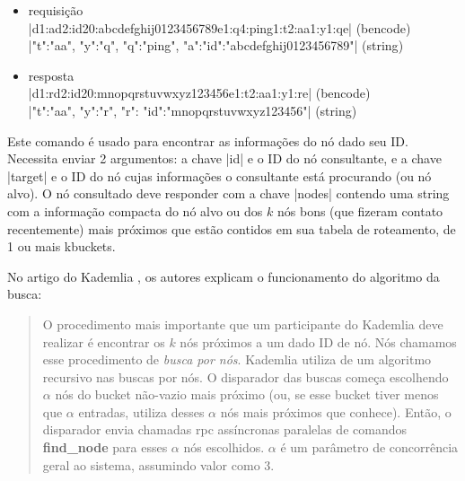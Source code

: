 \begin{itemize}
\begin{itemize}
    \item requisição \\
        \bverb|d1:ad2:id20:abcdefghij0123456789e1:q4:ping1:t2:aa1:y1:qe|
        (\gls*{bencode}) \\
        \sverb|{"t":"aa", "y":"q", "q":"ping", "a":{"id":"abcdefghij0123456789"}}|
        (\gls*{string})

    \item resposta \\
        \bverb|d1:rd2:id20:mnopqrstuvwxyz123456e1:t2:aa1:y1:re|
        (\gls*{bencode}) \\
        \sverb|{"t":"aa", "y":"r", "r": {"id":"mnopqrstuvwxyz123456"}}|
        (\gls*{string})
\end{itemize}


\newpage
{}

Este comando é usado para encontrar as informações do nó dado seu ID. Necessita enviar 2
argumentos: a chave \bverb|id| e o ID do nó consultante, e a chave \bverb|target| e o ID
do nó cujas informações o consultante está procurando (ou nó alvo). O nó consultado
deve responder com a chave \bverb|nodes| contendo uma \gls*{string} com a informação
compacta do nó alvo ou dos $k$ nós bons (que fizeram contato recentemente) mais
próximos que estão contidos em sua tabela de roteamento, de 1 ou mais \glspl*{kbucket}.

No artigo do Kademlia \cite{artigo:kademlia}, os autores explicam o funcionamento do
algoritmo da busca:

\blockquote{O procedimento mais importante que um participante do Kademlia deve realizar
é encontrar os $k$ nós próximos a um dado ID de nó. Nós chamamos esse procedimento de
\emph{busca por nós}. Kademlia utiliza de um algoritmo recursivo nas buscas por nós. O
disparador das buscas começa escolhendo $\alpha$ nós do \gls*{bucket} não-vazio mais
próximo (ou, se esse \gls*{bucket} tiver menos que $\alpha$ entradas, utiliza desses
$\alpha$ nós mais próximos que conhece). Então, o disparador envia chamadas \gls*{rpc}
assíncronas paralelas de comandos \textbf{find\_node} para esses $\alpha$ nós
escolhidos. $\alpha$ é um parâmetro de concorrência geral ao sistema, assumindo valor
como 3.

}
\end{itemize}
